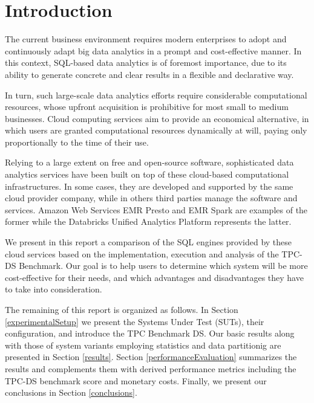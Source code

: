 \section{Introduction}\label{introduction}

The current business environment requires modern enterprises to adopt and continuously adapt big data analytics in a prompt and cost-effective manner. In this context, SQL-based data analytics is of foremost importance, due to its ability to generate concrete and clear results in a flexible and declarative way.

In turn, such large-scale data analytics efforts require considerable computational resources, whose upfront acquisition is prohibitive for most small to medium businesses. Cloud computing services aim to provide an economical alternative, in which users are granted computational resources dynamically at will, paying only proportionally to the time of their use.

Relying to a large extent on free and open-source software, sophisticated data analytics services have been built on top of these cloud-based computational infrastructures. In some cases, they are developed and supported by the same cloud provider company, while in others third parties manage the software and services. Amazon Web Services EMR Presto and EMR Spark are examples of the former while the Databricks Unified Analytics Platform represents the latter.

We present in this report a comparison of the SQL engines provided by these cloud services based on the implementation, execution and analysis of the TPC-DS Benchmark. Our goal is to help users to determine which system will be more cost-effective for their needs, and which advantages and disadvantages they have to take into consideration.

The remaining of this report is organized as follows. In Section \ref{experimentalSetup} we present the Systems Under Test (SUTs), their configuration, and introduce the TPC Benchmark DS. Our basic results along with those of system variants employing statistics and data partitionig are presented in Section \ref{results}. Section \ref{performanceEvaluation} summarizes the results and complements them with derived performance metrics including the TPC-DS benchmark score and monetary costs. Finally, we present our conclusions in Section \ref{conclusions}.




